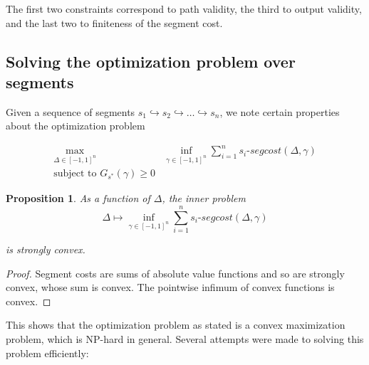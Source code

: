 \documentclass{article}
\newtheorem{proposition}{Proposition}[section]
\newcommand{\1}{\langle 1 \rangle}
\newcommand{\2}{\langle 2 \rangle}
\begin{document}
The first two constraints correspond to path validity, the third to output validity, and the last two to finiteness of the segment cost.

\subsection{Solving the optimization problem over segments}

Given a sequence of segments $s_1 \hookrightarrow s_2 \hookrightarrow \dots \hookrightarrow s_n$, we note certain properties about the optimization problem

\begin{align*}
    \max_{\Delta \in [-1, 1]^n} &\inf_{\gamma \in [-1, 1]^n} \sum_{i = 1}^n s_i\text{-}segcost(\Delta, \gamma) \\ 
    \text{subject to } G_{s^*}(\gamma) \geq 0
\end{align*}

\begin{proposition}
    As a function of $\Delta$, the inner problem
    \[\Delta \mapsto \inf_{\gamma \in [-1, 1]^n} \sum_{i = 1}^n s_i\text{-}segcost(\Delta, \gamma) \]

    is strongly convex.
\end{proposition}

\begin{proof}
    Segment costs are sums of absolute value functions and so are strongly convex, whose sum is convex. The pointwise infimum of convex functions is convex.
\end{proof}

This shows that the optimization problem as stated is a convex maximization problem, which is NP-hard in general. Several attempts were made to solving this problem efficiently: 
\end{document}
